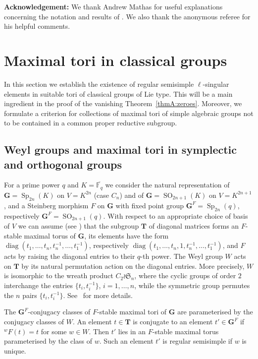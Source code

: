 \documentclass{ert-l}
\newcommand{\FF}{{\mathbb{F}}}
\newcommand{\fS}{{\mathfrak{S}}}
\newcommand{\bG}{{\mathbf{G}}}
\newcommand{\bT}{{\mathbf{T}}}
\newcommand{\diag}{{\operatorname{diag}}}
\newcommand{\Sp}{{\operatorname{Sp}}}
\newcommand{\SO}{{\operatorname{SO}}}
\theoremstyle{definition}
\theoremstyle{remark}
\begin{document}
\noindent
{\bf Acknowledgement:} We thank Andrew Mathas for useful explanations
concerning the notation and results of \cite{JM00}. We also thank the anonymous
referee for his helpful comments.


 \section{Maximal tori in classical groups}   \label{sec:maxtor}

In this section we establish the existence of regular semisimple $\ell$-singular
elements in suitable tori of classical groups of Lie type. This will be a
main ingredient in the proof of the vanishing Theorem~\ref{thmA:zeroes}.
Moreover, we formulate a criterion for collections of maximal tori of simple
algebraic groups not to be contained in a common proper reductive subgroup.

\subsection{Weyl groups and maximal tori in symplectic and orthogonal
groups}\label{subsec:WeylBCD}

For a prime power $q$ and $K = \overline{\FF_q}$ we consider the natural
representation of
$\bG = \Sp_{2n}(K)$ on $V = K^{2n}$ (case $C_n$) and of $\bG = \SO_{2n+1}(K)$
on $V = K^{2n+1}$, and a Steinberg morphism $F$ on $\bG$ with fixed
point group $\bG^F = \Sp_{2n}(q)$, respectively $\bG^F = \SO_{2n+1}(q)$. With
respect to an appropriate choice of basis of $V$ we can assume (see
\cite[Exmp.~6.7]{MT}) that the subgroup $\bT$ of diagonal matrices
forms an $F$-stable maximal torus of $\bG$, its elements have the form
$\diag(t_1, \ldots, t_n,t_n^{-1}, \ldots, t_1^{-1})$, respectively
$\diag(t_1, \ldots, t_n,1,t_n^{-1}, \ldots, t_1^{-1})$,
and $F$ acts by raising the diagonal entries to their $q$-th
power. The Weyl group $W$ acts on $\bT$ by its natural permutation action on
the diagonal entries. More precisely, $W$ is isomorphic to the wreath product
$C_2\wr\fS_n$, where the cyclic groups of order $2$ interchange the entries
$\{t_i, t_i^{-1}\}$, $i = 1, \ldots, n$, while the symmetric group
permutes the $n$ pairs $\{t_i, t_i^{-1}\}$. See~\cite[Chap.~15]{DM} for
more details.

The $\bG^F$-conjugacy classes of $F$-stable maximal tori of $\bG$ are
parameterised by the conjugacy classes of $W$. An element $t\in \bT$ is
conjugate to an element $t' \in \bG^F$ if ${}^wF(t)=t$ for some $w \in W$. Then
$t'$ lies in an $F$-stable maximal torus parameterised by the class of $w$.
Such an element $t'$ is regular semisimple if $w$ is unique.
\end{document}
